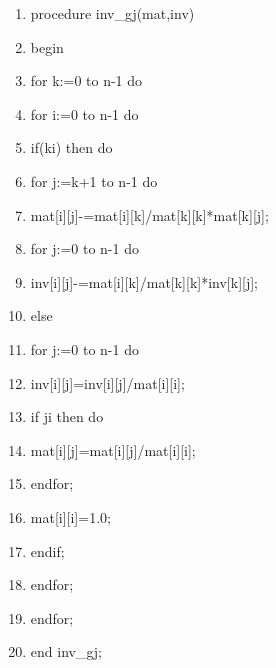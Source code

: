 \documentclass[a4paper]{article}
\begin{document}
\begin{enumerate}
\item procedure inv\_gj(mat,inv)

\item begin

\item \qquad for k:=0 to n-1 do

\item \qquad \qquad for i:=0 to n-1 do

\item \qquad \qquad \qquad if(k\TEXTsymbol{<}\TEXTsymbol{>}i) then do

\item \qquad \qquad \qquad \qquad for j:=k+1 to n-1 do

\item \qquad \qquad \qquad \qquad \qquad
mat[i][j]-=mat[i][k]/mat[k][k]*mat[k][j];

\item \qquad \qquad \qquad \qquad for j:=0 to n-1 do

\item \qquad \qquad \qquad \qquad \qquad
inv[i][j]-=mat[i][k]/mat[k][k]*inv[k][j];

\item \qquad \qquad \qquad else

\item \qquad \qquad \qquad \qquad for j:=0 to n-1 do

\item \qquad \qquad \qquad \qquad \qquad inv[i][j]=inv[i][j]/mat[i][i];

\item \qquad \qquad \qquad \qquad \qquad if j\TEXTsymbol{<}\TEXTsymbol{>}i
then do

\item \qquad \qquad \qquad \qquad \qquad \qquad
mat[i][j]=mat[i][j]/mat[i][i];

\item \qquad \qquad \qquad \qquad endfor;

\item \qquad \qquad \qquad \qquad mat[i][i]=1.0;

\item \qquad \qquad \qquad endif;

\item \qquad \qquad endfor;\qquad 

\item \qquad endfor;

\item end inv\_gj;
\end{enumerate}
\end{document}
